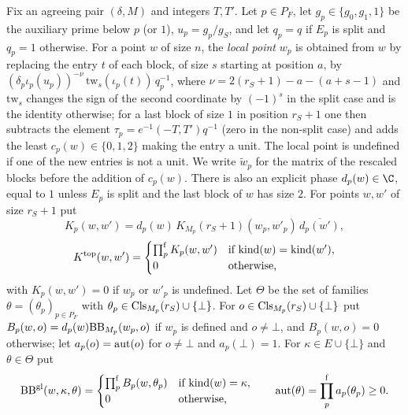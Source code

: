\begin{definition}\label{pf:thmS-leaves:def:top}
Fix an agreeing pair $(\delta,M)$ and integers $T,T'$. Let $p\in P_F$, let $g_p\in\{g_0,g_1,1\}$ be the auxiliary prime
below $p$ (or $1$), $u_p=g_p/g_S$, and let $q_p=q$ if $E_p$ is split and $q_p=1$ otherwise. For a point $w$ of size $n$,
the \emph{local point} $w_p$ is obtained from $w$ by replacing the entry $t$ of each block, of size $s$ starting at
position $a$, by $(\delta_p\iota_p(u_p))^{-\nu}\,\mathrm{tw}_s(\iota_p(t))\,q_p^{-1}$, where $\nu=2(r_S+1)-a-(a+s-1)$ and
$\mathrm{tw}_s$ changes the sign of the second coordinate by $(-1)^s$ in the split case and is the identity otherwise;
for a last block of size $1$ in position $r_S+1$ one then subtracts the element $\tau_p=e^{-1}(-T,T')q^{-1}$ (zero in the
non-split case) and adds the least $c_p(w)\in\{0,1,2\}$ making the entry a unit. The local point is undefined if one of
the new entries is not a unit. We write $\tilde w_p$ for the matrix of the rescaled blocks before the addition of
$c_p(w)$. There is also an explicit phase $d_p(w)\in\C$, equal to $1$ unless $E_p$ is split and the last block of $w$
has size $2$. For points $w,w'$ of size $r_S+1$ put
\[
K_p(w,w')=d_p(w)\,K_{M_p}(r_S+1)(w_p,w'_p)\,\overline{d_p(w')},
\]
\[
K^{\mathrm{top}}(w,w')=\begin{cases}\prod^{\mathrm f}_{p}K_p(w,w')&\text{if }\mathrm{kind}(w)=\mathrm{kind}(w'),\\
0&\text{otherwise,}\end{cases}
\]
with $K_p(w,w')=0$ if $w_p$ or $w'_p$ is undefined. Let $\Theta$ be the set of families $\theta=(\theta_p)_{p\in P_F}$ with
$\theta_p\in\mathrm{Cls}_{M_p}(r_S)\cup\{\bot\}$. For $o\in\mathrm{Cls}_{M_p}(r_S)\cup\{\bot\}$ put
$B_p(w,o)=d_p(w)\mathrm{BB}_{M_p}(w_p,o)$ if $w_p$ is defined and $o\ne\bot$, and $B_p(w,o)=0$ otherwise; let
$a_p(o)=\mathrm{aut}(o)$ for $o\ne\bot$ and $a_p(\bot)=1$. For $\kappa\in E\cup\{\bot\}$ and $\theta\in\Theta$ put
\[
\mathrm{BB}^{\mathrm{gl}}(w,\kappa,\theta)=\begin{cases}\prod^{\mathrm f}_pB_p(w,\theta_p)&\text{if }\mathrm{kind}(w)=\kappa,\\0&\text{otherwise,}
\end{cases}\qquad \mathrm{aut}(\theta)=\prod^{\mathrm f}_pa_p(\theta_p)\ge0 .
\]
\end{definition}

